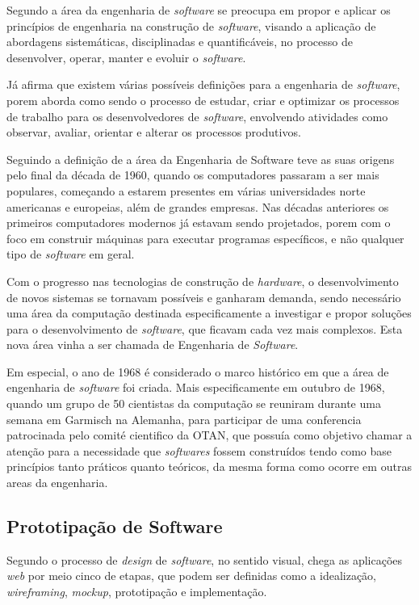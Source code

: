 Segundo \cite{2020:Valente} a área da engenharia de \emph{software}
se preocupa em propor e aplicar os princípios de engenharia na construção de
\emph{software}, visando a aplicação de abordagens sistemáticas, disciplinadas
e quantificáveis, no processo de desenvolver, operar, manter e evoluir
o \emph{software}.

Já \cite{2019:Wazlawick} afirma que existem várias possíveis definições para a
engenharia de \emph{software}, porem aborda como sendo o processo de
estudar, criar e optimizar os processos de trabalho para os desenvolvedores
de \emph{software}, envolvendo atividades como observar, avaliar, orientar e alterar
os processos produtivos.

Seguindo a definição de \cite{2020:Valente} a área da Engenharia de Software teve as suas
origens pelo final da década de 1960, quando os computadores passaram a ser mais
populares, começando a estarem presentes em várias universidades norte americanas
e europeias, além de grandes empresas. Nas décadas anteriores os primeiros
computadores modernos já estavam sendo projetados, porem com o foco em construir
máquinas para executar programas específicos, e não qualquer tipo de \emph{software}
em geral.

Com o progresso nas tecnologias de construção de \emph{hardware}, o desenvolvimento
de novos sistemas se tornavam possíveis e ganharam demanda, sendo necessário uma
área da computação destinada especificamente a investigar e propor soluções para
o desenvolvimento de \emph{software}, que ficavam cada vez mais complexos. Esta
nova área vinha a ser chamada de Engenharia de \emph{Software}.

Em especial, o ano de 1968 é considerado o marco histórico em que a área
de engenharia de \emph{software} foi criada. Mais especificamente em outubro
de 1968, quando um grupo de 50 cientistas da computação se reuniram durante
uma semana em Garmisch na Alemanha, para participar de uma conferencia
patrocinada pelo comité cientifico da OTAN, que possuía como objetivo
chamar a atenção para a necessidade que \emph{softwares} fossem construídos
tendo como base princípios tanto práticos quanto teóricos, da mesma forma
como ocorre em outras areas da engenharia.

\subsection{Prototipação de Software}
Segundo \cite{uzayr:mockups} o processo de \emph{design} de \emph{software},
no sentido visual, chega as aplicações \emph{web} por meio cinco de etapas,
que podem ser definidas como a idealização, \emph{wireframing}, \emph{mockup},
prototipação e implementação.

